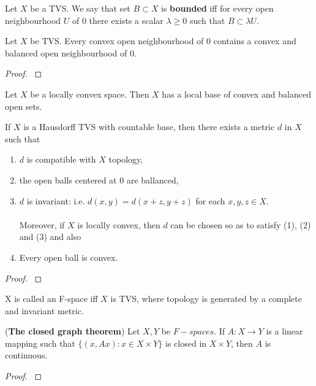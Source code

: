 \documentclass[main.tex]{subfiles}
\begin{document}
\begin{definition}
Let $X$ be a TVS. We say that set $B\subset X$ is \textbf{bounded} iff for every open neighbourhood $U$ of $0$ there exists a scalar $\lambda \geq 0$ such that $B\subset \lambda U$.
\end{definition}

\begin{theorem}
\label{base-of-locally-convex}
Let $X$ be TVS. Every convex open neighbourhood of $0$ contains a convex and balanced open neighbourhood of $0$.
\end{theorem}
\begin{proof}
\cite[See][1.14]{rudin1991}
\end{proof}

\begin{corollary}
Let $X$ be a locally convex space. Then $X$ has a local base of convex and balanced open sets.
\end{corollary}

\begin{theorem}
If $X$ is a Hausdorff TVS with countable base, then there exists a metric $d$ in $X$ such that
\begin{enumerate}
\item $d$ is compatible with $X$ topology,
\item the open balls centered at $0$ are ballanced,
\item $d$ is invariant: i.e. $d(x,y) = d(x+z,y+z)$ for each $x,y,z\in X$.
\\
\\
Moreover, if $X$ is locally convex, then $d$ can be chosen so as to satisfy (1), (2) and (3) and also
\item Every open ball is convex. 
\end{enumerate}
\end{theorem}
\begin{proof}
\cite[see][1.24]{rudin1991}
\end{proof}
\begin{definition}
X is called an F-space iff $X$ is TVS, where topology is generated by a complete and invariant metric.
\end{definition}

\begin{theorem}
\label{closed-graph-theorem} 
(\textbf{The closed graph theorem})
Let $X,Y$ be $F-spaces$. If $A:X\to Y$ is a linear mapping such that $\{(x, Ax): x\in X\times Y\}$ is closed in $X\times Y$, then $A$ is continuous.
\end{theorem}
\begin{proof}
\cite[See][2.15 The closed graph theorem]{rudin1991}
\end{proof}
\end{document}
